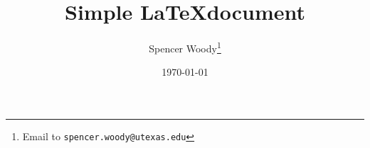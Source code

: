 \documentclass[usletter]{article}
\title{Simple \LaTeX document}
\author{Spencer Woody\footnote{Email to \texttt{spencer.woody@utexas.edu}}}
\affil{The University of Texas at Austin}
\date{\today}
\begin{document}
\maketitle



\cite{WoodyScott}


\pagebreak


\end{document}
